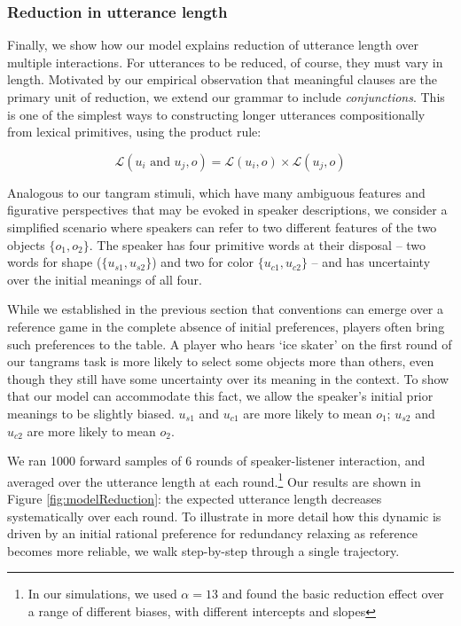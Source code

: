 \documentclass[manuscript]{stjour}
\begin{document}
\subsubsection{Reduction in utterance
length}\label{reduction-in-utterance-length}

Finally, we show how our model explains reduction of utterance length
over multiple interactions. For utterances to be reduced, of course,
they must vary in length. Motivated by our empirical observation that
meaningful clauses are the primary unit of reduction, we extend our
grammar to include \emph{conjunctions}. This is one of the simplest ways
to constructing longer utterances compositionally from lexical
primitives, using the product rule:

\[\mathcal{L}(u_i \textrm{ and } u_j, o) = \mathcal{L}(u_i, o) \times \mathcal{L}(u_j, o)\]

Analogous to our tangram stimuli, which have many ambiguous features and
figurative perspectives that may be evoked in speaker descriptions, we
consider a simplified scenario where speakers can refer to two different
features of the two objects \(\{o_1, o_2\}\). The speaker has four
primitive words at their disposal -- two words for shape
(\(\{u_{s1}, u_{s2}\}\)) and two for color \(\{u_{c1}, u_{c2}\}\) -- and
has uncertainty over the initial meanings of all four.

While we established in the previous section that conventions can emerge
over a reference game in the complete absence of initial preferences,
players often bring such preferences to the table. A player who hears
`ice skater' on the first round of our tangrams task is more likely to
select some objects more than others, even though they still have some
uncertainty over its meaning in the context. To show that our model can
accommodate this fact, we allow the speaker's initial prior meanings to
be slightly biased. \(u_{s1}\) and \(u_{c1}\) are more likely to mean
\(o_1\); \(u_{s2}\) and \(u_{c2}\) are more likely to mean \(o_2\).

We ran 1000 forward samples of 6 rounds of speaker-listener interaction,
and averaged over the utterance length at each round.\footnote{In our
  simulations, we used \(\alpha = 13\) and found the basic reduction
  effect over a range of different biases, with different intercepts and
  slopes} Our results are shown in Figure \ref{fig:modelReduction}: the
expected utterance length decreases systematically over each round. To
illustrate in more detail how this dynamic is driven by an initial
rational preference for redundancy relaxing as reference becomes more
reliable, we walk step-by-step through a single trajectory.
\end{document}
